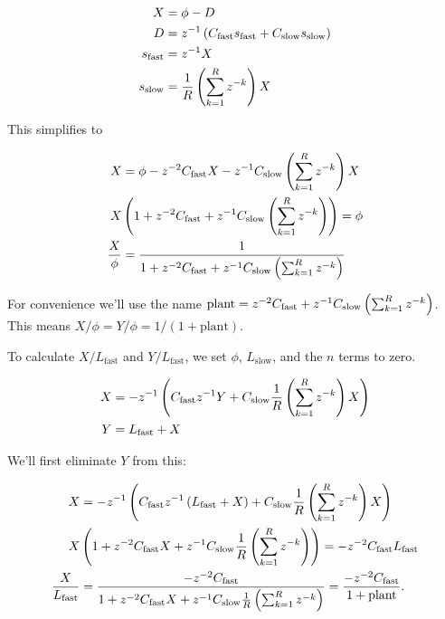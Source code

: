 \documentclass{article}
\begin{document}
    \begin{align*}
        X &= \phi - D \\
        D &= z^{-1} \left(C_{\text{fast}} s_{\text{fast}} + C_{\text{slow}} s_{\text{slow}}\right) \\
        s_{\text{fast}} &= z^{-1} X \\
        s_{\text{slow}} &= \frac{1}{R} \left(\sum_{k=1}^R z^{-k}\right) X \\
    \end{align*}

    This simplifies to

    \begin{align*}
        X &= \phi - z^{-2} C_{\text{fast}} X - z^{-1} C_{\text{slow}} \left(\sum_{k=1}^R z^{-k}\right) X\\
        X &\left(1 + z^{-2} C_{\text{fast}} + z^{-1} C_{\text{slow}} \left(\sum_{k=1}^R z^{-k}\right)\right) = \phi \\ 
        \frac{X}{\phi} &= \frac{1}{1 + z^{-2} C_{\text{fast}} + z^{-1} C_{\text{slow}} \left(\sum_{k=1}^R z^{-k}\right)}
    \end{align*}

    For convenience we'll use the name $\text{plant} = z^{-2} C_{\text{fast}} + z^{-1} C_{\text{slow}} \left(\sum_{k=1}^R z^{-k}\right)$. This means $X/\phi = Y/\phi = 1 / (1 + \text{plant})$.

    To calculate $X/L_{\text{fast}}$ and $Y/L_{\text{fast}}$, we set $\phi$, $L_{\text{slow}}$, and the $n$ terms to zero.

    \begin{align*}
        X &= -z^{-1} \left(C_{\text{fast}} z^{-1} Y + C_{\text{slow}} \frac{1}{R} \left(\sum_{k=1}^R z^{-k}\right) X\right) \\
        Y &= L_{\text{fast}} + X \\
    \end{align*}

    We'll first eliminate $Y$ from this:

    \begin{align*}
        X &= -z^{-1} \left(C_{\text{fast}} z^{-1} \left(L_{\text{fast}} + X\right) + C_{\text{slow}} \frac{1}{R} \left(\sum_{k=1}^R z^{-k}\right) X\right) \\
        X & \left(1 + z^{-2} C_{\text{fast}} X + z^{-1}  C_{\text{slow}} \frac{1}{R} \left(\sum_{k=1}^R z^{-k}\right)\right) = -z^{-2} C_{\text{fast}} L_{\text{fast}}\\
        \frac{X}{L_{\text{fast}}} &= \frac{-z^{-2} C_{\text{fast}}}{1 + z^{-2} C_{\text{fast}} X + z^{-1}  C_{\text{slow}} \frac{1}{R} \left(\sum_{k=1}^R z^{-k}\right)} = \frac{-z^{-2} C_{\text{fast}}}{1 + \text{plant}}.
    \end{align*}
\end{document}
